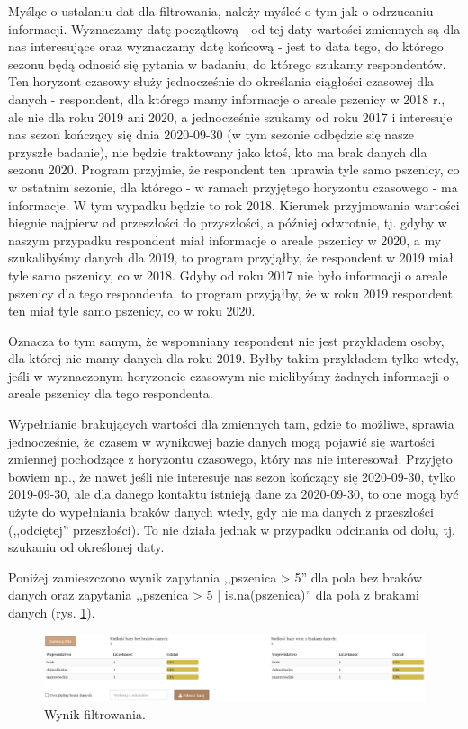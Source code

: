 \documentclass[12pt, twoside, hidelinks]{report}
\begin{document}
Myśląc o ustalaniu dat dla filtrowania, należy myśleć o tym jak o odrzucaniu informacji. Wyznaczamy datę początkową - od tej daty wartości zmiennych są dla nas interesujące oraz wyznaczamy datę końcową - jest to data tego, do którego sezonu będą odnosić się pytania w badaniu, do którego szukamy respondentów. Ten horyzont czasowy służy jednocześnie do określania ciągłości czasowej dla danych - respondent, dla którego mamy informacje o areale pszenicy w 2018 r., ale nie dla roku 2019 ani 2020, a jednocześnie szukamy od roku 2017 i interesuje nas sezon kończący się dnia 2020-09-30 (w tym sezonie odbędzie się nasze przyszłe badanie), nie będzie traktowany jako ktoś, kto ma brak danych dla sezonu 2020. Program przyjmie, że respondent ten uprawia tyle samo pszenicy, co w ostatnim sezonie, dla którego - w ramach przyjętego horyzontu czasowego - ma informacje. W tym wypadku będzie to rok 2018. Kierunek przyjmowania wartości biegnie najpierw od przeszłości do przyszłości, a później odwrotnie, tj. gdyby w naszym przypadku respondent miał informacje o areale pszenicy w 2020, a my szukalibyśmy danych dla 2019, to program przyjąłby, że respondent w 2019 miał tyle samo pszenicy, co w 2018. Gdyby od roku 2017 nie było informacji o areale pszenicy dla tego respondenta, to program przyjąłby, że w roku 2019 respondent ten miał tyle samo pszenicy, co w roku 2020. \par
Oznacza to tym samym, że wspomniany respondent nie jest przykładem osoby, dla której nie mamy danych dla roku 2019. Byłby takim przykładem tylko wtedy, jeśli w wyznaczonym horyzoncie czasowym nie mielibyśmy żadnych informacji o areale pszenicy dla tego respondenta. \par
Wypełnianie brakujących wartości dla zmiennych tam, gdzie to możliwe, sprawia jednocześnie, że czasem w wynikowej bazie danych mogą pojawić się wartości zmiennej pochodzące z horyzontu czasowego, który nas nie interesował. Przyjęto bowiem np., że nawet jeśli nie interesuje nas sezon kończący się 2020-09-30, tylko 2019-09-30, ale dla danego kontaktu istnieją dane za 2020-09-30, to one mogą być użyte do wypełniania braków danych wtedy, gdy nie ma danych z przeszłości (,,odciętej'' przeszłości). To nie działa jednak w przypadku odcinania od dołu, tj. szukaniu od określonej daty. \par
Poniżej zamieszczono wynik zapytania ,,pszenica > 5'' dla pola bez braków danych oraz zapytania ,,pszenica > 5 | is.na(pszenica)'' dla pola z brakami danych (rys. \ref{wynik_filtrowania}). \par
\begin{figure}[h!]
\includegraphics[width = 1\textwidth]{1.3.}
\caption{Wynik filtrowania.}
\label{wynik_filtrowania}
\end{figure}
\end{document}
